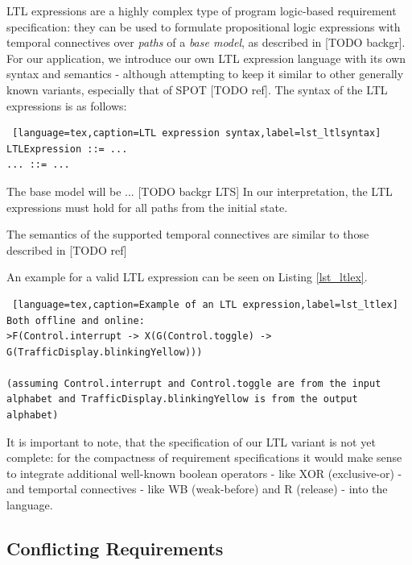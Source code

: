 LTL expressions are a highly complex type of program logic-based requirement specification: they can be used to formulate propositional logic expressions with temporal connectives over \textit{paths} of a \textit{base model}, as described in [TODO backgr]. For our application, we introduce our own LTL expression language with its own syntax and semantics - although attempting to keep it similar to other generally known variants, especially that of SPOT [TODO ref].
The syntax of the LTL expressions is as follows:
\bigskip
\begin{lstlisting} [language=tex,caption=LTL expression syntax,label=lst_ltlsyntax]
LTLExpression ::= ...
... ::= ...
\end{lstlisting}

The base model will be ... [TODO backgr LTS]
In our interpretation, the LTL expressions must hold for all paths from the initial state.

The semantics of the supported temporal connectives are similar to those described in [TODO ref] %

An example for a valid LTL expression can be seen on Listing \ref{lst_ltlex}.

\bigskip
\begin{lstlisting} [language=tex,caption=Example of an LTL expression,label=lst_ltlex]
Both offline and online:
>F(Control.interrupt -> X(G(Control.toggle) -> G(TrafficDisplay.blinkingYellow)))

(assuming Control.interrupt and Control.toggle are from the input alphabet and TrafficDisplay.blinkingYellow is from the output alphabet)
\end{lstlisting}

It is important to note, that the specification of our LTL variant is not yet complete: for the compactness of requirement specifications it would make sense to integrate additional well-known boolean operators - like XOR (exclusive-or) - and temportal connectives - like WB (weak-before) and R (release) - into the language. 

\subsection{Conflicting Requirements} \label{subs_conf}

